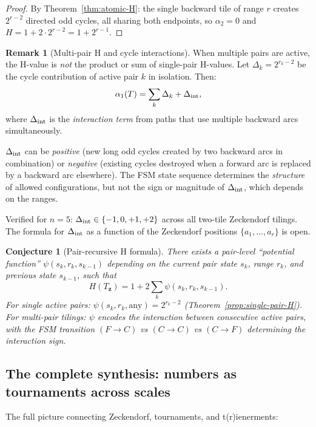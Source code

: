 \documentclass[12pt,reqno]{amsart}
\theoremstyle{definition}
\newtheorem{remark}[theorem]{Remark}
\theoremstyle{plain}
\newtheorem{conjecture}[theorem]{Conjecture}
\begin{document}
\begin{proof}
By Theorem~\ref{thm:atomic-H}: the single backward tile of range $r$
creates $2^{r-2}$ directed odd cycles, all sharing both endpoints,
so $\alpha_2=0$ and $H=1+2\cdot2^{r-2}=1+2^{r-1}$.
\end{proof}

\begin{remark}[Multi-pair H and cycle interactions]
When multiple pairs are active, the H-value is \emph{not} the product or
sum of single-pair H-values.  Let $\Delta_k=2^{r_k-2}$ be the cycle
contribution of active pair $k$ in isolation.  Then:
\[
  \alpha_1(T) = \sum_k\Delta_k + \Delta_{\rm int},
\]
where $\Delta_{\rm int}$ is the \emph{interaction term} from paths that
use multiple backward arcs simultaneously.

$\Delta_{\rm int}$ can be \emph{positive} (new long odd cycles created
by two backward arcs in combination) or \emph{negative} (existing cycles
destroyed when a forward arc is replaced by a backward arc elsewhere).
The FSM state sequence determines the \emph{structure} of allowed
configurations, but not the sign or magnitude of $\Delta_{\rm int}$,
which depends on the ranges.

Verified for $n=5$: $\Delta_{\rm int}\in\{-1,0,+1,+2\}$ across all
two-tile Zeckendorf tilings.  The formula for $\Delta_{\rm int}$ as a
function of the Zeckendorf positions $\{a_1,\ldots,a_r\}$ is open.
\end{remark}

\begin{conjecture}[Pair-recursive H formula]\label{conj:pair-H}
There exists a pair-level ``potential function'' $\psi(s_k, r_k, s_{k-1})$
depending on the current pair state $s_k$, range $r_k$, and previous
state $s_{k-1}$, such that
\[
  H(T_\mathbf{z})=1+2\sum_k\psi(s_k,r_k,s_{k-1}).
\]
For single active pairs: $\psi(s_k,r_k,\text{any})=2^{r_k-2}$ (Theorem~\ref{prop:single-pair-H}).
For multi-pair tilings: $\psi$ encodes the interaction between consecutive
active pairs, with the FSM transition $(F\to C)$ vs $(C\to C)$ vs $(C\to F)$
determining the interaction sign.
\end{conjecture}

\subsection{The complete synthesis: numbers as tournaments across scales}
\label{ssec:final-synthesis}

The full picture connecting Zeckendorf, tournaments, and t(r)ienerments:
\end{document}
